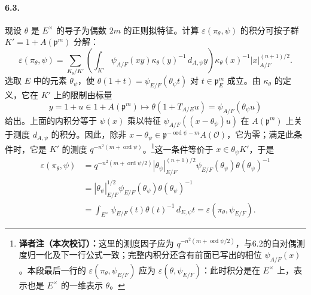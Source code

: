 \paragraph*{6.3.}现设 $\theta$ 是 $E^\times$ 的导子为偶数 $2m$ 的正则拟特征。计算 $\varepsilon(\pi_\theta,\psi)$ 的积分可按子群 $K'=1+A(\mathfrak p^m)$ 分解：
\[
\varepsilon(\pi_\theta,\psi)=\sum_{K_\theta/K'}
\left(\int_{K'}\psi_{A/F}(xy)\kappa_\theta(y)^{-1}\,d_{A,\psi}y\right)
\kappa_\theta(x)^{-1}|x|_{A/F}^{(n+1)/2}.
\]
选取 $E$ 中的元素 $\theta_\psi$，使 $\theta(1+t)=\psi_{E/F}(\theta_\psi t)$ 对 $t\in\mathfrak p_E^m$ 成立。由 $\kappa_\theta$ 的定义，它在 $K'$ 上的限制由标量
\[
y=1+u\in1+A(\mathfrak p^m)\longmapsto\theta(1+T_{A/E}u)=\psi_{A/F}(\theta_\psi u)
\]
给出。上面的内积分等于 $\psi(x)$ 乘以特征 $\psi_{A/F}((x-\theta_\psi)u)$ 在 $A(\mathfrak p^m)$ 上关于测度 $d_{A,\psi}$ 的积分。因此，除非 $x-\theta_\psi\in\mathfrak p^{-\operatorname{ord}\psi-m}A(\mathcal O)$，它为零；满足此条件时，它是 $K'$ 的测度 $q^{-n^2(m+\operatorname{ord}\psi)}$。\footnote{\textbf{译者注（本次校订）：}这里的测度因子应为 $q^{-n^2(m+\operatorname{ord}\psi/2)}$，与6.2的自对偶测度归一化及下一行公式一致；完整内积分还含有前面已写出的相位 $\psi_{A/F}(x)$。本段最后一行的 $\varepsilon(\pi_\theta,\psi_{E/F})$ 应为 $\varepsilon(\theta,\psi_{E/F})$：此时积分是在 $E^\times$ 上，表示也是 $E^\times$ 的一维表示 $\theta$。}这一条件等价于 $x\in\theta_\psi K'$，于是
\[
\begin{aligned}
\varepsilon(\pi_\theta,\psi)
&=q^{-n^2(m+\operatorname{ord}\psi/2)}|\theta_\psi|_{E/F}^{(n+1)/2}
\psi_{E/F}(\theta_\psi)\theta(\theta_\psi)^{-1}\\
&=|\theta_\psi|_{E/F}^{1/2}\psi_{E/F}(\theta_\psi)\theta(\theta_\psi)^{-1}\\
&=\int_{E^\times}\psi_{E/F}(t)\theta(t)^{-1}\,d_{E,\psi}t
=\varepsilon(\pi_\theta,\psi_{E/F}).
\end{aligned}
\]
